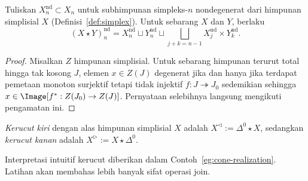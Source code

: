 \begin{proposition}\label{prop:join-nd}
	Tuliskan $X_n^{\mathrm{nd}}\subset X_n$ untuk subhimpunan simpleks-$n$
	nondegenerat dari himpunan simplisial $X$
	(Definisi~\ref{def:simplex}). Untuk sebarang $X$ dan $Y$, berlaku
	\[ (X \star Y)^{\mathrm{nd}}_n = X^{\mathrm{nd}}_n \sqcup Y^{\mathrm{nd}}_n \sqcup \bigsqcup_{j+k=n-1} X^{\mathrm{nd}}_j \times Y^{\mathrm{nd}}_k. \]
\end{proposition}
\begin{proof}
	Misalkan $Z$ himpunan simplisial. Untuk sebarang himpunan terurut total
	hingga tak kosong $J$, elemen $x\in Z(J)$ degenerat jika dan hanya jika
	terdapat pemetaan monoton surjektif tetapi tidak injektif
	$f:J\twoheadrightarrow J_0$ sedemikian sehingga
	$x\in\Image[f^*:Z(J_0)\to Z(J)]$. Pernyataan selebihnya langsung mengikuti
	pengamatan ini.
\end{proof}

\begin{definition}\label{def:cone-simplicial}
	\emph{Kerucut kiri} dengan alas himpunan simplisial $X$ adalah
	$X^{\lhd}:=\Delta^0\star X$, sedangkan \emph{kerucut kanan} adalah
	$X^{\rhd}:=X\star\Delta^0$.
\end{definition}

Interpretasi intuitif kerucut diberikan dalam
Contoh~\ref{eg:cone-realization}. Latihan akan membahas lebih banyak sifat
operasi join.
